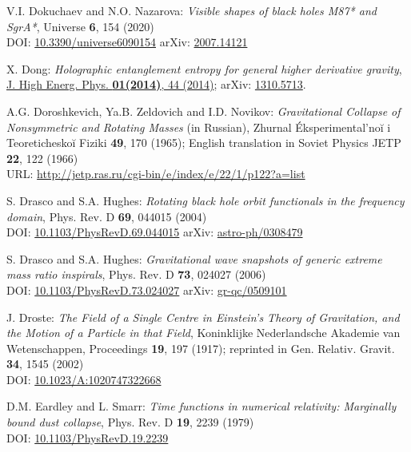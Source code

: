 \begin{thebibliography}{123}
V.I. Dokuchaev and N.O. Nazarova: {\em Visible shapes of black holes M87* and SgrA*},
Universe {\bf 6}, 154 (2020)\\
DOI: \href{https://doi.org/10.3390/universe6090154}{10.3390/universe6090154}\hfill
arXiv: \href{https://arxiv.org/abs/2007.14121}{2007.14121}

X. Dong:
{\em Holographic entanglement entropy for general higher derivative gravity},
\href{https://doi.org/10.1007/JHEP01(2014)044}{J. High Energ. Phys. {\bf 01(2014)}, 44 (2014)};
arXiv: \href{https://arxiv.org/abs/1310.5713}{1310.5713}.

A.G. Doroshkevich, Ya.B. Zeldovich and I.D. Novikov:
{\em Gravitational Collapse of Nonsymmetric and Rotating Masses} (in Russian),
Zhurnal Éksperimental'noĭ i Teoreticheskoĭ Fiziki {\bf 49}, 170 (1965);
English translation in Soviet Physics JETP {\bf 22}, 122 (1966)\\
URL: \url{http://jetp.ras.ru/cgi-bin/e/index/e/22/1/p122?a=list}

S. Drasco and S.A. Hughes:
{\em Rotating black hole orbit functionals in the frequency domain},
Phys. Rev. D {\bf 69}, 044015 (2004)\\
DOI: \href{https://doi.org/10.1103/PhysRevD.69.044015}{10.1103/PhysRevD.69.044015}\hfill
arXiv: \href{https://arxiv.org/abs/astro-ph/0308479}{astro-ph/0308479}

S. Drasco and S.A. Hughes:
{\em Gravitational wave snapshots of generic extreme mass ratio inspirals},
Phys. Rev. D {\bf 73}, 024027 (2006)\\
DOI: \href{https://doi.org/10.1103/PhysRevD.73.024027}{10.1103/PhysRevD.73.024027}\hfill
arXiv: \href{https://arxiv.org/abs/gr-qc/0509101}{gr-qc/0509101}

J. Droste:
{\em The Field of a Single Centre in Einstein's Theory of Gravitation, and the Motion of a Particle in that Field},
Koninklijke Nederlandsche Akademie van Wetenschappen, Proceedings {\bf 19}, 197 (1917);
reprinted in Gen. Relativ. Gravit. {\bf 34}, 1545 (2002)\\
DOI: \href{https://doi.org/10.1023/A:1020747322668}{10.1023/A:1020747322668}

D.M. Eardley and L. Smarr:
{\em Time functions in numerical relativity: Marginally bound dust collapse},
Phys. Rev. D {\bf 19}, 2239 (1979)\\
DOI: \href{https://doi.org/10.1103/PhysRevD.19.2239}{10.1103/PhysRevD.19.2239}


\end{thebibliography}
